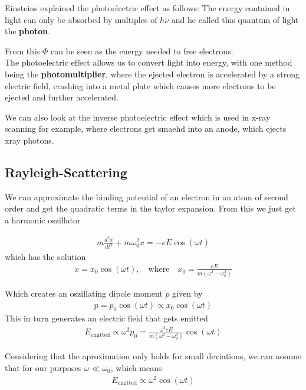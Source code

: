 Einsteins explained the photoelectric effect as follows: The energy contained in light can only be absorbed by multiples of $h \nu$ and he called this quantum of light the \textbf{photon}.

From this $\Phi$ can be seen as the energy needed to free electrons.\\

The photoelectric effect allows us to convert light into energy, with one method being the \textbf{photomultiplier}, where the ejected electron is accelerated by a strong electric field, crashing into a metal plate which causes more electrons to be ejected and further accelerated.


We can also look at the inverse photoelectric effect which is used in x-ray scanning for example, where electrons get smaehd into an anode, which ejects xray photons.


\subsection{Rayleigh-Scattering}

We can approximate the binding potential of an electron in an atom of second order and get the quadratic terms in the taylor expansion. From this we just get a harmonic oszillator

\begin{align*}
	m \frac{d^2 x}{dt^2} + m \omega_0^2 x = -e E \cos(\omega t)
\end{align*}
which has the solution
\begin{align*}
	x = x_0 \cos(\omega t), \quad \text{where} \quad x_0 = \frac{e E}{m(\omega^2 - \omega_0^2)}
\end{align*}

Which creates an oszillating dipole moment $p$ given by
\begin{align*}
	p = p_0 \cos(\omega t) \propto x_0 \cos(\omega t)
\end{align*}
This in turn generates an electric field that gets emitted
\begin{align*}
	E_{\text{emitted}} \propto \omega^2 p_0 = \frac{\omega^2 e E}{m(\omega^2 - \omega_0^2)} \cos(\omega t)
\end{align*}

Considering that the aproximation only holds for small deviations, we can assume that for our purposes $\omega \ll \omega_0$, which means
\begin{align*}
	E_{\text{emitted}}	\propto \omega^2 \cos(\omega t)
\end{align*}




